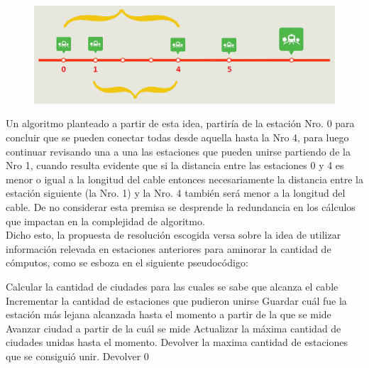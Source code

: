   \begin{figure}[h!]
   \begin{center}
 	\includegraphics[scale=0.5]{imagenes/ej1/estaciones.png}
	\label{estaciones}
   \end{center}
 \end{figure}

Un algoritmo planteado a partir de esta idea, partiría de la estación Nro. 0 para concluir que se pueden conectar todas desde aquella hasta la Nro 4, para luego continuar revisando una a una las estaciones que pueden unirse partiendo de la Nro 1, cuando resulta evidente que si la distancia entre las estaciones  0 y 4 es menor o igual a la longitud del cable entonces necesariamente la distancia entre la estación siguiente (la Nro. 1) y la Nro. 4 también será menor a la longitud del cable. De no considerar esta premisa se desprende la redundancia en los cálculos que impactan en la complejidad de algoritmo. \\
 
Dicho esto, la propuesta de resolución escogida versa sobre la idea de utilizar información relevada en estaciones anteriores para aminorar la cantidad de cómputos, como se esboza en el siguiente pseudocódigo:


\begin{algorithmic} 
	
		\STATE Calcular la cantidad de ciudades para las cuales se sabe que alcanza el cable
			\STATE Incrementar la cantidad de estaciones que pudieron unirse
			\STATE Guardar cuál fue la estación más lejana alcanzada hasta el momento a partir de la que se mide
		\ENDWHILE
		\STATE Avanzar ciudad a partir de la cuál se mide
		\STATE Actualizar la máxima cantidad de ciudades unidas hasta el momento.
	\ENDWHILE
		\STATE Devolver la maxima cantidad de estaciones que se consiguió unir.
	\ELSE
		\STATE Devolver 0
	\ENDIF
\ENDIF
\end{algorithmic}

